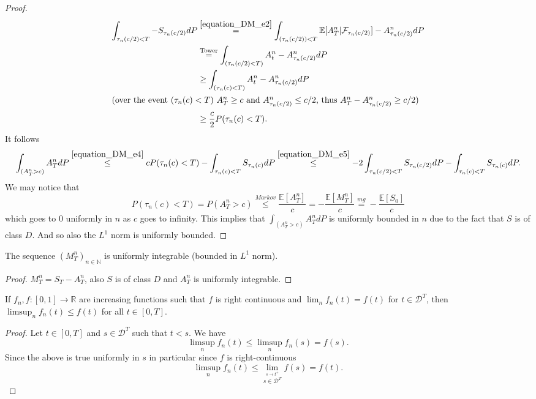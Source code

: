 \begin{proof}
\begin{align}
  \int_{\tau_n(c/2)<T}-S_{\tau_n(c/2)}dP
  &\stackrel{\eqref{equation_DM_e2}}{=}\int_{(\tau_n(c/2))<T}\mathbb{E}[A^n_T\vert\mathcal{F}_{\tau_n(c/2)}]-A^n_{\tau_n(c/2)}dP \nonumber
  \\
  &\stackrel{\mathrm{Tower}}{=}\int_{(\tau_n(c/2)<T)}A^n_t-A^n_{\tau_n(c/2)}dP\nonumber
  \\
  &\geq \int_{(\tau_n(c)<T)}A^n_t-A^n_{\tau_n(c/2)}dP\nonumber
  \\
  \intertext{(over the event $(\tau_n(c)<T)$ $A^n_T\geq c$ and $A^n_{\tau_n(c/2)}\leq c/2$, thus $A^n_T-A^n_{\tau_n(c/2)}\geq c/2$)}
  &\geq \frac{c}{2}P(\tau_n(c)<T).\label{equation_DM_e5}
  \end{align}
  It follows
  $$
  \int_{(A^n_T>c)}A^n_TdP\stackrel{\eqref{equation_DM_e4}}{\leq}cP(\tau_n(c)<T)-\int_{\tau_n(c)<T}S_{\tau_n(c)}dP\stackrel{\eqref{equation_DM_e5}}{\leq}-2\int_{\tau_n(c/2)<T}S_{\tau_n(c/2)}dP-\int_{\tau_n(c)<T}S_{\tau_n(c)}dP.
  $$
  We may notice that
  $$
  P(\tau_n(c)<T)=P(A^n_T>c)\stackrel{Markov}{\leq}\frac{\mathbb{E}[A^n_T]}{c}=-\frac{\mathbb{E}[M^n_T]}{c}\stackrel{mg}{=}-\frac{\mathbb{E}[S_0]}{c}
  $$
  which goes to $0$ uniformly in $n$ as $c$ goes to infinity.
  This implies that $\int_{(A^n_T>c)}A^n_TdP$ is uniformly bounded in $n$ due to the fact that $S$ is of class $D$. And so also the $L^1$ norm is uniformly bounded.
\end{proof}


\begin{lemma}\label{lem:M_uniform_integrable}
  The sequence $(M^n_T)_{n\in\mathbb{N}}$ is uniformly integrable (bounded in $L^1$ norm).
\end{lemma}

\begin{proof}
  $M^n_T=S_T-A^n_T$, also $S$ is of class $D$ and $A^n_T$ is uniformly integrable.
\end{proof}


\begin{lemma}\label{lem:incr_fun_lim_right_cont_limsup_ineq}
  If $f_n, f : [0, 1] \rightarrow \mathbb{R}$ are increasing functions such that $f$ is right continuous and
  $\lim_n f_n(t) = f (t)$ for $t \in\mathcal{D}^T$, then  $\limsup_n  f_n(t) \leq f (t)$ for all $t \in [0, T]$.
\end{lemma}

\begin{proof}
  Let $t\in[0,T]$ and $s\in\mathcal{D}^T$ such that $t<s$. We have
  $$
  \limsup_n f_n(t)\leq \limsup_n f_n(s)=f(s).
  $$
  Since the above is true uniformly in $s$ in particular since $f$ is right-continuous
  $$
  \limsup_n f_n(t)\leq\lim_{\stackrel{s\rightarrow t^+}{s\in\mathcal{D}^T}}f(s)=f(t).
  $$
\end{proof}



